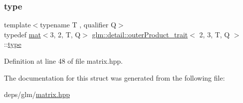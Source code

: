 \subsubsection{\texorpdfstring{type}{type}}
{\footnotesize\ttfamily template$<$typename T , qualifier Q$>$ \\
typedef \hyperlink{structglm_1_1mat}{mat}$<$3, 2, T, Q$>$ \hyperlink{structglm_1_1detail_1_1outerProduct__trait}{glm\+::detail\+::outer\+Product\+\_\+trait}$<$ 2, 3, T, Q $>$\+::\hyperlink{structglm_1_1mat_3_013_00_012_00_01T_00_01Q_01_4}{type}}



Definition at line 48 of file matrix.\+hpp.



The documentation for this struct was generated from the following file\+:\begin{DoxyCompactItemize}
\item 
deps/glm/\hyperlink{matrix_8hpp}{matrix.\+hpp}\end{DoxyCompactItemize}
